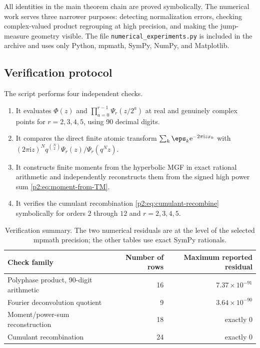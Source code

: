 \documentclass[11pt,oneside]{article}
\theoremstyle{definition}
\newcommand{\e}{\mathrm e}
\newcommand{\ii}{\mathrm i}
\begin{document}
All identities in the main theorem chain are proved symbolically.  The
numerical work serves three narrower purposes: detecting normalization errors,
checking complex-valued product regrouping at high precision, and making the
jump-measure geometry visible.  The file
\texttt{numerical\_experiments.py} is included in the archive and uses only
Python, mpmath, SymPy, NumPy, and Matplotlib.

\subsection{Verification protocol}

The script performs four independent checks.
\begin{enumerate}
\item It evaluates $\Phi(z)$ and
$\prod_{a=0}^{r-1}\Psi_r(z/2^a)$ at real and genuinely complex points for
$r=2,3,4,5$, using 90 decimal digits.
\item It compares the direct finite atomic transform
$\sum_k\eps_k\e^{-2\pi\ii zx_k}$ with
$(2\pi\ii z)^Nq^{\binom N2}\Psi_r(z)/\Psi_r(q^Nz)$.
\item It constructs finite moments from the hyperbolic MGF in exact rational
arithmetic and independently reconstructs them from the signed high power sum
\eqref{p2:eq:moment-from-TM}.
\item It verifies the cumulant recombination
\eqref{p2:eq:cumulant-recombine} symbolically for orders $2$ through $12$ and
$r=2,3,4,5$.
\end{enumerate}

\begin{table}[htbp]
\centering
\begin{tabular}{@{}lrr@{}}
\toprule
Check family & Number of rows & Maximum reported residual\\
\midrule
Polyphase product, 90-digit arithmetic & 16 & $7.37\times10^{-91}$\\
Fourier deconvolution quotient & 9 & $3.64\times10^{-90}$\\
Moment/power-sum reconstruction & 18 & exactly $0$\\
Cumulant recombination & 24 & exactly $0$\\
\bottomrule
\end{tabular}
\caption{Verification summary.  The two numerical residuals are at the level
of the selected mpmath precision; the other tables use exact SymPy rationals.}
\label{p2:tab:verification-summary}
\end{table}
\end{document}
